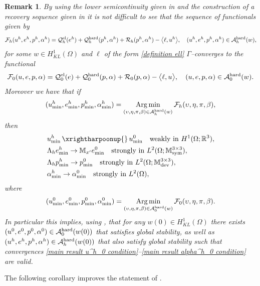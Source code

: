 \documentclass[reqno,10pt]{amsart}
\numberwithin{equation}{section}
\newtheorem{remark}[theorem]{Remark}
\theoremstyle{remark}
\newcommand{\RED}{\color{black}}
\newcommand{\BLACK}{\color{black}}
\newcommand{\calA}{\mathcal{A}}
\newcommand{\M}{\mathbb{M}}
\newcommand{\calQ}{\mathcal{Q}}
\newcommand{\R}{\mathbb{R}}
\newcommand{\calR}{\mathcal{R}}
\DeclareMathOperator{\dev}{dev}
\DeclareMathOperator{\sym}{sym}
\DeclareMathOperator*{\argmin}{Arg\,min}
\newcommand{\strong}{\to}
\newcommand{\weak}{\,\xrightharpoonup{}\,}
\begin{document}
\begin{remark} \label{remark gamma convergence} 
By using {\RED the\BLACK} lower semicontinuity given in  and {\RED the\BLACK} construction of {\RED a\BLACK} recovery sequence given in \Cref{recovery sequence}{\RED,\BLACK} it is not difficult to see that the sequence of functionals given by 
\[
	\mathcal{F}_h(u^h, e^h, p^h, \alpha^h)=\calQ^{\rm el}_{h}(e^h) + \calQ^{\rm hard}_{h}(p^h, \alpha^h) +\calR_{h}(p^h, \alpha^h)- \big\langle \ell, u^h \big\rangle, \quad (u^h, e^h, p^h, \alpha^h) \in \calA_{h}^{\rm hard}( w),
\]
for some $w \in H^1_{KL}(\Omega)$ and $\ell$ of the form \eqref{definition ell} 
$\Gamma$--converges to the functional 
\[
	\mathcal{F}_0 (u, e, p, \alpha)=	\calQ^{\rm el}_{0}(e) + \calQ^{\rm hard}_{0}(p, \alpha) + \calR_{0}(p, \alpha)-\big\langle \ell, u \big\rangle,\quad (u, e, p, \alpha) \in \calA_{0}^{\rm hard}(w).
\]
Moreover we have that if 
\[
	(u^h_{\rm min}, e^h_{\rm min}, p^h_{\rm min}, \alpha^h_{\rm min})=\displaystyle\argmin_{(\upsilon, \eta, \pi, \beta) \in \calA_{h}^{\rm hard}(w)}
	\mathcal{F}_h (\upsilon, \eta, \pi, \beta),
\]
then 
\begin{align}
	& u^h_{\rm min} \weak u^0_{\rm min} \quad \text{weakly in $H^1(\Omega;\R^3)$},\\
	& \Lambda_h e^h_{\rm min} \strong \M_{x'}e_{\rm min}^0 \quad \text{strongly in $L^2(\Omega;\M^{3 \times 3}_{\sym})$},\\
	& \Lambda_h p^h_{\rm min} \strong p_{\rm min}^0 \quad \text{strongly in $L^2(\Omega;\M^{3 \times 3}_{\dev})$},\\
	& \alpha^h_{\rm min} \strong \alpha_{\rm min}^0 \quad \text{strongly in $L^2(\Omega)$},
\end{align}
where 
\[
	(u^0_{\rm min}, e^0_{\rm min}, p^0_{\rm min}, \alpha^0_{\rm min})=\displaystyle\argmin_{(\upsilon, \eta, \pi, \beta) \in \calA_{0}^{\rm hard}(w)}
	\mathcal{F}_0 (\upsilon, \eta, \pi, \beta).
\]
In particular this implies, using , that for any $w(0) \in H^1_{KL}(\Omega)$ there exists $(u^0, e^0, p^0, \alpha^0) \in \calA_{0}^{\rm hard}(w(0))$ that satisfies global stability{\RED,\BLACK} as well as $(u^h, e^h, p^h, \alpha^h) \in \calA_{h}^{\rm hard}(w(0))$ that also satisfy global stability such that convergences \eqref{main result u^h_0 condition}--\eqref{main result alpha^h_0 condition} are valid.
\end{remark}

The following corollary improves the statement of .
\end{document}
